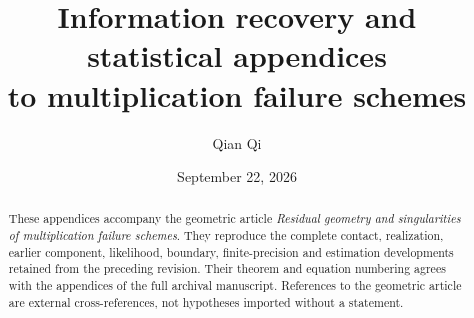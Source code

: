 \documentclass[11pt,reqno]{amsart}
\title[Information recovery and statistical appendices]{Information recovery and statistical appendices\\to multiplication failure schemes}
\author{Qian Qi}
\date{September 22, 2026}
\numberwithin{equation}{section}
\theoremstyle{definition}\newtheorem{definition}[theorem]{Definition}
\theoremstyle{remark}\newtheorem{remark}[theorem]{Remark}
\begin{document}
\begin{abstract}
These appendices accompany the geometric article \emph{Residual geometry
and singularities of multiplication failure schemes}. They reproduce the
complete contact, realization, earlier component, likelihood, boundary,
finite-precision and estimation developments retained from the preceding
revision. Their theorem and equation numbering agrees with the appendices
of the full archival manuscript. References to the geometric article are
external cross-references, not hypotheses imported without a statement.
\end{abstract}
\maketitle
\appendix









\end{document}
